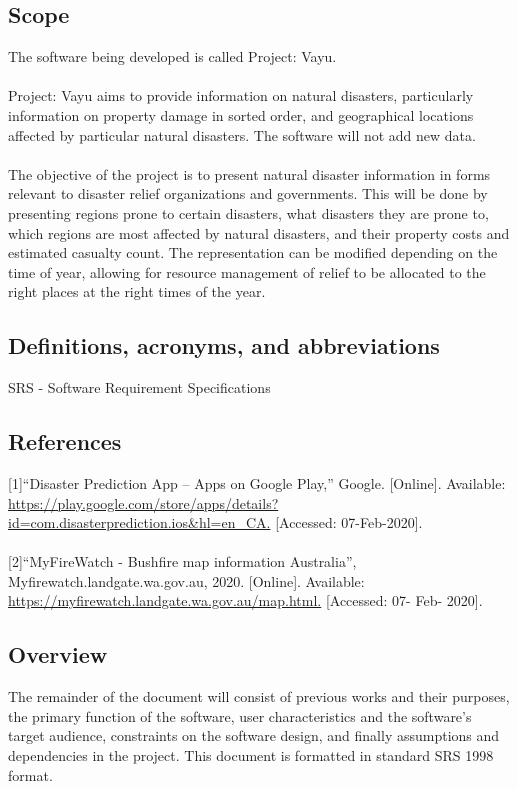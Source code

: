\documentclass{article}
\begin{document}
\subsection{Scope}
	The software being developed is called Project: Vayu.\\\\
 
 Project: Vayu aims to provide information on natural disasters, 
 particularly information on property damage in sorted order, and 
 geographical locations affected by particular natural disasters. 
 The software will not add new data.\\\\
 
The objective of the project is to present natural disaster information in forms relevant to
disaster relief organizations and governments. This will be done by presenting regions prone to
certain disasters, what disasters they are prone to, which regions are most affected by natural disasters, 
and their property costs and estimated casualty count. The representation can be 
modified depending on the time of year, allowing for 
resource management of relief to be allocated to the right places 
at the right times of the year.
 
\subsection{Definitions, acronyms, and abbreviations}
SRS - Software Requirement Specifications

\subsection{References}
[1]“Disaster Prediction App – Apps on Google Play,” Google. [Online]. 
Available: \url{ https://play.google.com/store/apps/details?id=com.disasterprediction.ios&hl=en_CA.} [Accessed: 07-Feb-2020]. \\\\
 
[2]“MyFireWatch - Bushfire map information Australia”, Myfirewatch.landgate.wa.gov.au, 2020. [Online].
 Available: \url{ https://myfirewatch.landgate.wa.gov.au/map.html.} [Accessed: 07- Feb- 2020].

 \subsection{Overview}
 The remainder of the document will consist of previous works and their purposes, 
 the primary function of the software, user characteristics and the software’s 
 target audience, constraints on the software design, and finally assumptions and 
 dependencies in the project. This document is formatted in standard SRS 1998 format.
\end{document}
